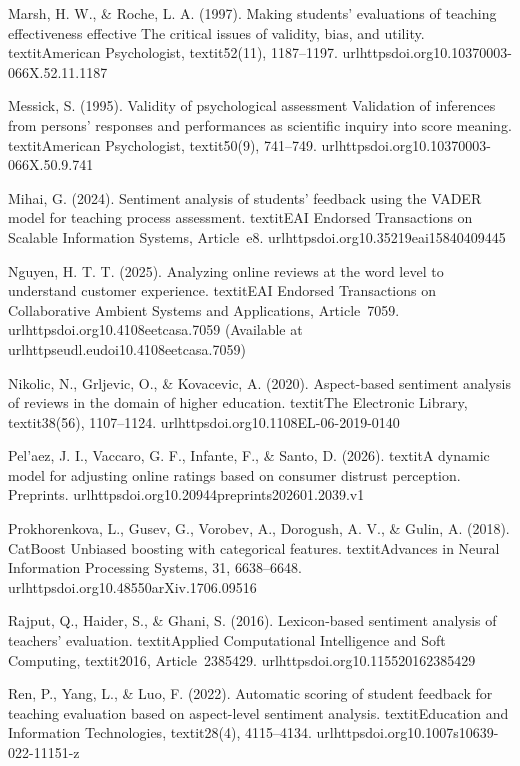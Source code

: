 Marsh, H. W., & Roche, L. A. (1997). Making students' evaluations of teaching effectiveness effective The critical issues of validity, bias, and utility. textit{American Psychologist}, textit{52}(11), 1187--1197. url{httpsdoi.org10.10370003-066X.52.11.1187}

Messick, S. (1995). Validity of psychological assessment Validation of inferences from persons' responses and performances as scientific inquiry into score meaning. textit{American Psychologist}, textit{50}(9), 741--749. url{httpsdoi.org10.10370003-066X.50.9.741}

Mihai, G. (2024). Sentiment analysis of students' feedback using the VADER model for teaching process assessment. textit{EAI Endorsed Transactions on Scalable Information Systems}, Article~e8. url{httpsdoi.org10.35219eai15840409445}

Nguyen, H. T. T. (2025). Analyzing online reviews at the word level to understand customer experience. textit{EAI Endorsed Transactions on Collaborative Ambient Systems and Applications}, Article~7059. url{httpsdoi.org10.4108eetcasa.7059} (Available at url{httpseudl.eudoi10.4108eetcasa.7059})

Nikolic, N., Grljevic, O., & Kovacevic, A. (2020). Aspect-based sentiment analysis of reviews in the domain of higher education. textit{The Electronic Library}, textit{38}(56), 1107--1124. url{httpsdoi.org10.1108EL-06-2019-0140}

Pel'{a}ez, J. I., Vaccaro, G. F., Infante, F., & Santo, D. (2026). textit{A dynamic model for adjusting online ratings based on consumer distrust perception.} Preprints. url{httpsdoi.org10.20944preprints202601.2039.v1}

Prokhorenkova, L., Gusev, G., Vorobev, A., Dorogush, A. V., & Gulin, A. (2018). CatBoost Unbiased boosting with categorical features. textit{Advances in Neural Information Processing Systems, 31}, 6638--6648. url{httpsdoi.org10.48550arXiv.1706.09516}

Rajput, Q., Haider, S., & Ghani, S. (2016). Lexicon-based sentiment analysis of teachers’ evaluation. textit{Applied Computational Intelligence and Soft Computing}, textit{2016}, Article~2385429. url{httpsdoi.org10.115520162385429}

Ren, P., Yang, L., & Luo, F. (2022). Automatic scoring of student feedback for teaching evaluation based on aspect-level sentiment analysis. textit{Education and Information Technologies}, textit{28}(4), 4115--4134. url{httpsdoi.org10.1007s10639-022-11151-z}

